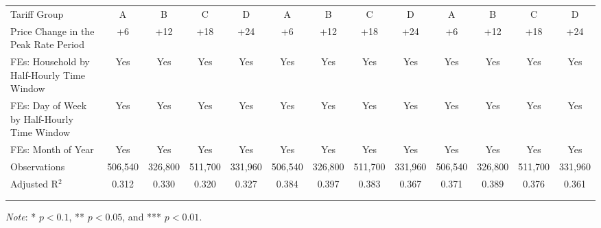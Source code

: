 {\begin{sidewaystable}[t!]
\begin{adjustbox}{scale = 0.75}
\begin{threeparttable}
\begin{tabular}{@{\extracolsep{1pt}}lcccccccccccc}
                    Tariff Group & A & B & C & D & A & B & C & D & A & B & C & D \\
                    Price Change in the Peak Rate Period & +6 & +12 & +18 & +24 & +6 & +12 & +18 & +24 & +6 & +12 & +18 & +24 \\
                    FEs: Household by Half-Hourly Time Window & Yes & Yes & Yes & Yes & Yes & Yes & Yes & Yes & Yes & Yes & Yes & Yes \\
                    FEs: Day of Week by Half-Hourly Time Window & Yes & Yes & Yes & Yes & Yes & Yes & Yes & Yes & Yes & Yes & Yes & Yes \\
                    FEs: Month of Year & Yes & Yes & Yes & Yes & Yes & Yes & Yes & Yes & Yes & Yes & Yes & Yes \\
                    Observations & 506,540 & 326,800 & 511,700 & 331,960 & 506,540 & 326,800 & 511,700 & 331,960 & 506,540 & 326,800 & 511,700 & 331,960 \\
                    Adjusted R$^{2}$ & 0.312 & 0.330 & 0.320 & 0.327 & 0.384 & 0.397 & 0.383 & 0.367 & 0.371 & 0.389 & 0.376 & 0.361 \\
                    \\[-2.0ex]
                    \hline \hline
                    \\[-4.5ex]
                \end{tabular}
                \begin{tablenotes}[flushleft]
                    \footnotesize
                    \item \textit{Note}: * $p < 0.1$, ** $p < 0.05$, and *** $p < 0.01$.
                \end{tablenotes}
            \end{threeparttable}
        \end{adjustbox}
    \end{sidewaystable}
}
